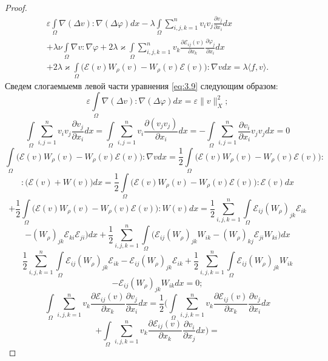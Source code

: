 \begin{proof}
    \begin{equation}\label{eq:3.9}
        \begin{gathered}
            \varepsilon\int\limits_{\Omega}\nabla(\Delta v):\nabla(\Delta\varphi)dx-\lambda\int\limits_{\Omega}\sum_{i,j,k=1}^n v_iv_j\frac{\partial v_j}{\partial x_i}dx \\
            +\lambda\nu\int\limits_{\Omega}\nabla v:\nabla\varphi+2\lambda\varkappa\int\limits_{\Omega}\sum_{i,j,k=1}^n v_k\frac{\partial\mathcal{E}_{ij}(v)}{\partial x_k}\frac{\partial\varphi_j}{\partial x_i}dx \\
            +2\lambda\varkappa\int\limits_{\Omega}\bigg(\mathcal{E}(v)W_{\rho}(v)-W_{\rho}(v)\mathcal{E}(v)\bigg):\nabla v dx=\lambda\langle f, v\rangle.
        \end{gathered}
    \end{equation}
Сведем слогаемыемв левой части уравнения \ref{eq:3.9} следующим образом:
$$\varepsilon\int\limits_{\Omega}\nabla(\Delta v):\nabla(\Delta\varphi)dx=\varepsilon\|v\|^2_X;$$
$$\int\limits_{\Omega}\sum_{i,j=1}^n v_iv_j\frac{\partial v_j}{\partial x_i}dx=\int\limits_{\Omega}\sum_{i,j=1}^n v_i
\frac{\partial (v_jv_j)}{\partial x_i}dx=-\int\limits_{\Omega}\sum_{i,j=1}^n\frac{\partial v_i}{\partial x_i}v_jv_jdx=0$$
$$\int\limits_{\Omega}\bigg(\mathcal{E}(v)W_{\rho}(v)-W_{\rho}(v)\mathcal{E}(v)\bigg):\nabla v dx=\frac{1}{2}\int\limits_{\Omega}\bigg(\mathcal{E}(v)
W_{\rho}(v)-W_{\rho}(v)\mathcal{E}(v)\bigg):$$
$$:\bigg(\mathcal{E}(v)+W(v)\bigg)dx=\frac{1}{2}\int\limits_{\Omega}\bigg(\mathcal{E}(v)W_{\rho}(v)-W_{\rho}(v)\mathcal{E}(v)\bigg):\mathcal{E}(v)dx$$
$$+\frac{1}{2}\int\limits_{\Omega}\bigg(\mathcal{E}(v)W_{\rho}(v)-W_{\rho}(v)\mathcal{E}(v)\bigg):W(v)dx=\frac{1}{2}\sum_{i,j,k=1}^n\int\limits_{\Omega}
\mathcal{E}_{ij}(W_{\rho})_{jk}\mathcal{E}_{ik}$$
$$-(W_{\rho})_{jk}\mathcal{E}_{ki}\mathcal{E}_{ji}\bigg)dx+\frac{1}{2}\sum_{i,j,k=1}^n\int\limits_{\Omega}\bigg(\mathcal{E}_{ij}(W_{\rho})_{jk}W_{ik}-
(W_{\rho})_{kj}\mathcal{E}_{ji}W_{ki}\bigg) dx$$
$$\frac{1}{2}\sum_{i,j,k=1}^n\int\limits_{\Omega}\mathcal{E}_{ij}(W_{\rho})_{jk}\mathcal{E}_{ik}-\mathcal{E}_{ij}(W_{\rho})_{jk}\mathcal{E}_{ik}+
\frac{1}{2}\sum_{i,j,k=1}^n\int\limits_{\Omega}\mathcal{E}_{ij}(W_{\rho})_{jk}W_{ik}$$
$$-\mathcal{E}_{ij}(W_{\rho})_{jk}W_{ik}dx=0;$$
$$\int\limits_{\Omega}\sum_{i,j,k=1}^n v_k\frac{\partial\mathcal{E}_{ij}(v)}{\partial x_k}\frac{\partial v_j}{\partial x_i}dx=\frac{1}{2}\bigg(
\int\limits_{\Omega}\sum_{i,j,k=1}^n v_k\frac{\partial\mathcal{E}_{ij}(v)}{\partial x_k}\frac{\partial v_j}{\partial x_i}dx$$
$$+\int\limits_{\Omega}\sum_{i,j,k=1}^nv_k\frac{\partial\mathcal{E}_{ij}(v)}{\partial x_k}\frac{\partial v_i}{\partial x_j}dx\bigg)=
$$
\end{proof}

